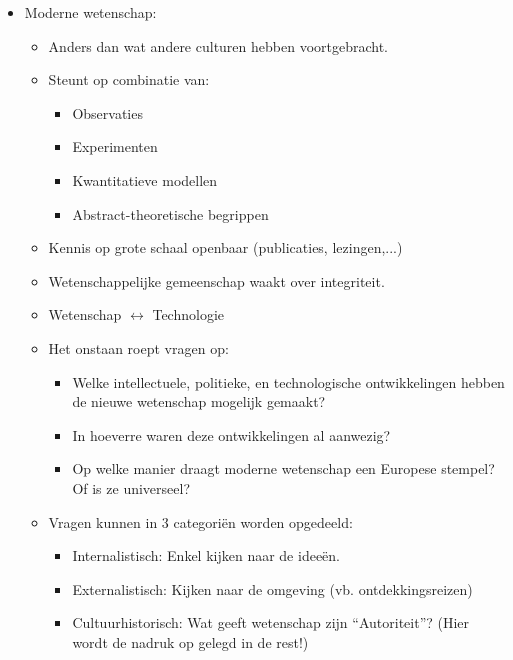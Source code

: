 \documentclass{article}
\begin{document}
\begin{itemize}
      \item Moderne wetenschap:
      \begin{itemize}
        \item Anders dan wat andere culturen hebben voortgebracht.
        \item Steunt op combinatie van:
        \begin{itemize}
          \item Observaties
          \item Experimenten
          \item Kwantitatieve modellen
          \item Abstract-theoretische begrippen
        \end{itemize}
        \item Kennis op grote schaal openbaar (publicaties, lezingen,...)
        \item Wetenschappelijke gemeenschap waakt over integriteit.
        \item Wetenschap $\leftrightarrow$ Technologie
        \item Het onstaan roept vragen op:
        \begin{itemize}
          \item Welke intellectuele, politieke, en technologische ontwikkelingen hebben de nieuwe wetenschap mogelijk gemaakt?
          \item In hoeverre waren deze ontwikkelingen al aanwezig?
          \item Op welke manier draagt moderne wetenschap een Europese stempel? Of is ze universeel?
        \end{itemize}
        \item Vragen kunnen in 3 categori\"en worden opgedeeld:
        \begin{itemize}
          \item Internalistisch: Enkel kijken naar de idee\"en.
          \item Externalistisch: Kijken naar de omgeving (vb. ontdekkingsreizen)
          \item Cultuurhistorisch: Wat geeft wetenschap zijn ``Autoriteit''? (Hier wordt de nadruk op gelegd in de rest!)
        \end{itemize}
      \end{itemize}
    \end{itemize}

  \newpage
\end{document}
